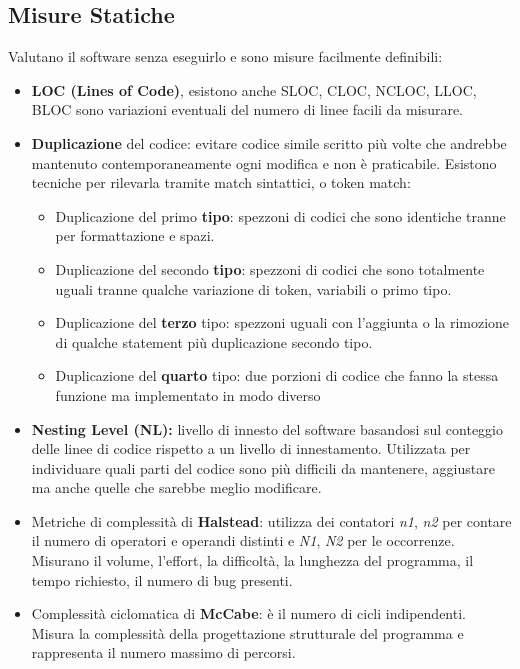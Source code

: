 \subsection{Misure Statiche}
Valutano il software senza eseguirlo e sono misure facilmente definibili:
\begin{itemize}
    \item \textbf{LOC (Lines of Code)}, esistono anche SLOC, CLOC, NCLOC, LLOC, BLOC sono variazioni eventuali del numero di linee facili da misurare.
    \item \textbf{Duplicazione} del codice: evitare codice simile scritto più volte che andrebbe mantenuto contemporaneamente ogni modifica e non è praticabile. Esistono tecniche per rilevarla tramite match sintattici, o token match: 
    \begin{itemize}
        \item Duplicazione del primo \textbf{tipo}: spezzoni di codici che sono identiche tranne per formattazione e spazi.
        \item Duplicazione del secondo \textbf{tipo}: spezzoni di codici che sono totalmente uguali tranne qualche variazione di token, variabili o primo tipo.
        \item Duplicazione del \textbf{terzo} tipo: spezzoni uguali con l'aggiunta o la rimozione di qualche statement più duplicazione secondo tipo.
        \item Duplicazione del \textbf{quarto} tipo: due porzioni di codice che fanno la stessa funzione ma implementato in modo diverso
    \end{itemize}
    \item \textbf{Nesting Level (NL):} livello di innesto del software basandosi sul conteggio delle linee di codice rispetto a un livello di innestamento. Utilizzata per individuare quali parti del codice sono più difficili da mantenere, aggiustare ma anche quelle che sarebbe meglio modificare.
    \item Metriche di complessità di \textbf{Halstead}: utilizza dei contatori \textit{n1}, \textit{n2} per contare il numero di operatori e operandi distinti e \textit{N1}, \textit{N2} per le occorrenze. Misurano il volume, l'effort, la difficoltà, la lunghezza del programma, il tempo richiesto, il numero di bug presenti.
    \item Complessità ciclomatica di \textbf{McCabe}: è il numero di cicli indipendenti. Misura la complessità della progettazione strutturale del programma e rappresenta il numero massimo di percorsi.
\end{itemize}

